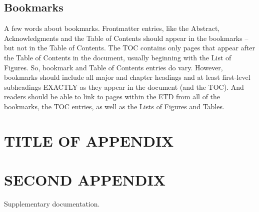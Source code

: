\documentclass{UCF_ETD}
\begin{document}
\section{Bookmarks}
A few words about bookmarks. Frontmatter entries, like the Abstract, Acknowledgments and the Table of Contents should appear in the bookmarks – but not in the Table of Contents. The TOC contains only pages that appear after the Table of Contents in the document, usually beginning with the List of Figures. So, bookmark and Table of Contents entries do vary.
However, bookmarks should include all major and chapter headings and at least first-level subheadings EXACTLY as they appear in the document (and the TOC). And readers should be able to link to pages within the ETD from all of the bookmarks, the TOC entries, as well as the Lists of Figures and Tables.

\appendix

\chapter{TITLE OF APPENDIX}
\newpage



\chapter{SECOND APPENDIX}
\newpage

Supplementary documentation.

\backmatter



\end{document}
